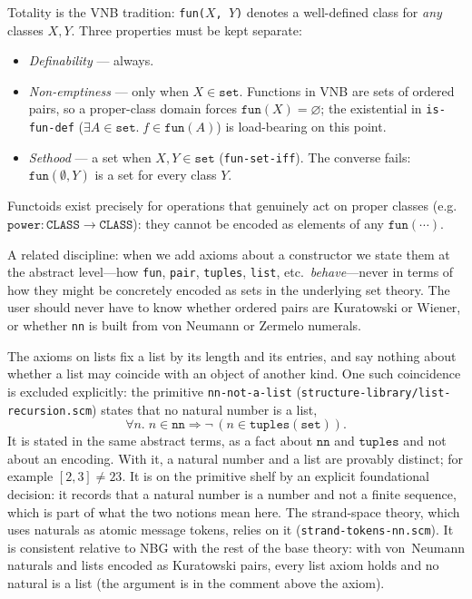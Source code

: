 \begin{remark}
Totality is the VNB tradition: \texttt{fun($X$, $Y$)} denotes a
well-defined class for \emph{any} classes $X, Y$.  Three properties
must be kept separate:
\begin{itemize}
\item \emph{Definability} --- always.
\item \emph{Non-emptiness} --- only when $X \in \mathtt{set}$.
  Functions in VNB are sets of ordered pairs, so a proper-class
  domain forces $\mathtt{fun}(X) = \varnothing$; the existential in
  \texttt{is-fun-def} ($\exists A \in \mathtt{set}.\; f \in
  \mathtt{fun}(A)$) is load-bearing on this point.
\item \emph{Sethood} --- a set when $X, Y \in \mathtt{set}$
  (\texttt{fun-set-iff}).  The converse fails: $\mathtt{fun}(\emptyset, Y)$
  is a set for every class $Y$.
\end{itemize}
Functoids exist precisely for operations that genuinely act on
proper classes (e.g.\ $\mathtt{power}: \mathtt{CLASS} \to
\mathtt{CLASS}$): they cannot be encoded as elements of any
$\mathtt{fun}(\cdots)$.
\end{remark}

\begin{remark}
A related discipline: when we add axioms about a constructor we state
them at the abstract level---how \texttt{fun}, \texttt{pair},
\texttt{tuples}, \texttt{list}, etc.\ \emph{behave}---never in terms
of how they might be concretely encoded as sets in the underlying
set theory.  The user should never have to know whether ordered pairs
are Kuratowski or Wiener, or whether \texttt{nn} is built from von
Neumann or Zermelo numerals.

The axioms on lists fix a list by its length and its entries, and say
nothing about whether a list may coincide with an object of another
kind.  One such coincidence is excluded explicitly: the primitive
\texttt{nn-not-a-list} (\texttt{structure-library/list-recursion.scm})
states that no natural number is a list,
\[ \forall n.\; n \in \mathtt{nn} \Rightarrow
   \neg\,(n \in \mathtt{tuples}(\mathtt{set})). \]
It is stated in the same abstract terms, as a fact about $\mathtt{nn}$
and $\mathtt{tuples}$ and not about an encoding.  With it, a natural
number and a list are provably distinct; for example
$[2,3] \neq 23$.  It is on the primitive shelf by an explicit
foundational decision: it records that a natural number is a number and
not a finite sequence, which is part of what the two notions mean here.  The
strand-space theory, which uses naturals as atomic message tokens,
relies on it (\texttt{strand-tokens-nn.scm}).  It is consistent relative
to NBG with the rest of the base theory: with von~Neumann naturals and
lists encoded as Kuratowski pairs, every list axiom holds and no natural
is a list (the argument is in the comment above the axiom).
\end{remark}

